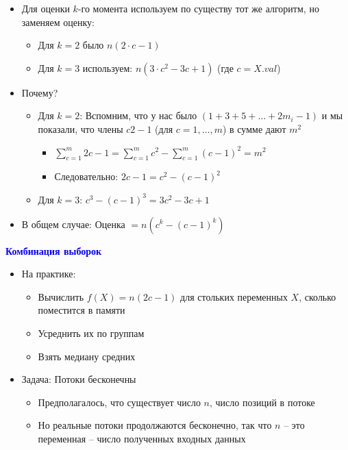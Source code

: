\documentclass[landscape]{slides}
\begin{document}
\begin{normalsize}
\begin{slide}
\begin{itemize}
\item Для оценки $k$-го момента используем по существу тот же алгоритм, но заменяем оценку:
  \begin{itemize}
  \item Для $k=2$ было $n(2\cdot c-1)$
  \item Для $k=3$ используем: $n(3\cdot c^2-3c+1)$ (где $c=X.val$)
  \end{itemize}
\item Почему?
  \begin{itemize}
  \item Для $k=2$: Вспомним, что у нас было $(1+3+5+\ldots+2m_i-1)$ и мы показали, что члены
$c2-1$ (для $c=1,\ldots,m$) в сумме дают $m^2$
    \begin{itemize}
    \item $\sum_{c=1}^m 2c - 1 = \sum_{c=1}^m c^2 - \sum_{c=1}^m(c-1)^2=m^2$
    \item Следовательно: $2c-1=c^2 - (c-1)^2$
    \end{itemize}
  \item Для $k=3$: $c^3-(c-1)^3 = 3c^2-3c+1$
  \end{itemize}
\item В общем случае: Оценка $=n(c^k-(c-1)^k)$
\end{itemize}
\end{slide}


\begin{slide}
\textbf{\textcolor{blue}{Комбинация выборок}}

\begin{itemize}
\item На практике:
  \begin{itemize}
  \item Вычислить $f(X) = n(2c-1)$ для стольких переменных $X$, сколько поместится в памяти
  \item Усреднить их по группам
  \item Взять медиану средних
  \end{itemize}
\item Задача: Потоки бесконечны
  \begin{itemize}
  \item Предполагалось, что существует число $n$, число позиций в потоке
  \item Но реальные потоки продолжаются бесконечно, так что $n$ -- это переменная -- число полученных входных данных
  \end{itemize}
\end{itemize}
\end{slide}



\end{normalsize}
\end{document}
